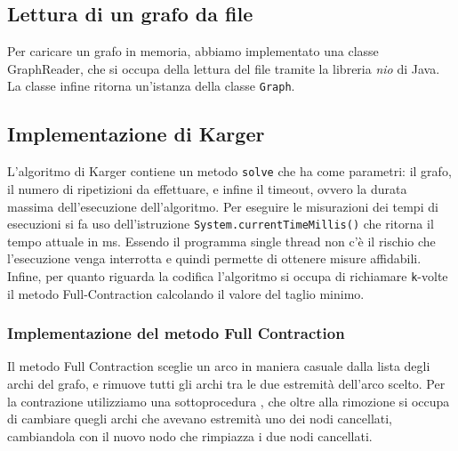 \subsection{Lettura di un grafo da file}
Per caricare un grafo in memoria, abbiamo implementato una classe GraphReader,
che si occupa della lettura del file tramite la libreria \textit{nio} di Java.
La classe infine ritorna un'istanza della classe \texttt{Graph}.
\subsection{Implementazione di Karger}
L'algoritmo di Karger contiene un metodo \texttt{solve} che ha come parametri: il grafo,
il numero di ripetizioni da effettuare, e infine il timeout, ovvero la durata massima
dell'esecuzione dell'algoritmo.
Per eseguire le misurazioni dei tempi di esecuzioni si fa uso dell'istruzione
\texttt{System.currentTimeMillis()} che ritorna il tempo attuale in ms.
Essendo il programma single thread non c'è il rischio che l'esecuzione venga interrotta e
quindi permette di ottenere misure affidabili.
Infine, per quanto riguarda la codifica l'algoritmo si occupa di richiamare \texttt{k}-volte
il metodo Full-Contraction calcolando il valore del taglio minimo.
\subsubsection{Implementazione del metodo Full Contraction}
Il metodo Full Contraction sceglie un arco in maniera casuale dalla lista degli archi del grafo, e rimuove
tutti gli archi tra le due estremità dell'arco scelto. Per la contrazione utilizziamo una sottoprocedura ,
che oltre alla rimozione si occupa di cambiare quegli archi che avevano estremità uno dei nodi cancellati, cambiandola
con il nuovo nodo che rimpiazza i due nodi cancellati.
